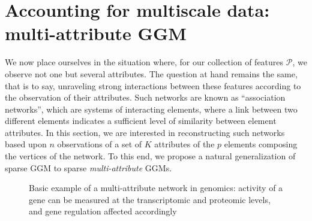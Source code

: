 \section{Accounting for multiscale data: multi-attribute GGM}
\label{sec:multiattribute_ggm}

We now place  ourselves in the situation where, for  our collection of
features $\mathcal{P}$, we observe not one but several attributes. The
question at hand  remains the same, that is to  say, unraveling strong
interactions between  these features  according to the  observation of
their   attributes.   Such   networks  are   known  as   ``association
networks'', which  are systems of  interacting elements, where  a link
between  two  different  elements  indicates  a  sufficient  level  of
similarity  between  element  attributes.   In this  section,  we  are
interested in reconstructing such networks based upon $n$ observations
of a set of $K$ attributes  of the $p$ elements composing the vertices
of the  network. To this end,  we propose a natural  generalization of
sparse GGM to sparse \emph{multi-attribute} GGMs.


\begin{figure}[htbp!]
  \centering
  \caption{Basic example of a multi-attribute network in genomics:
    activity  of a  gene  can  be measured  at  the transcriptomic  and
    proteomic levels, and gene regulation affected accordingly}
\label{fig:central_dogma}
\end{figure}

